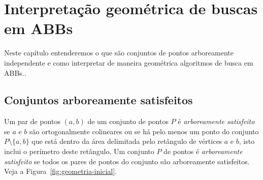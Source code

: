 
\chapter{Interpretação geométrica de buscas em ABBs}
\label{cap:geometria}

Neste capítulo entenderemos o que são conjuntos de pontos arboreamente independente e como interpretar de maneira geométrica algoritmos de busca em ABBs..

\section{Conjuntos arboreamente satisfeitos}

Um par de pontos $(a,b)$ de um conjunto de pontos $P$ é \textit{arboreamente satisfeito} se $a$ e $b$ são ortogonalmente colineares ou se há pelo menos um ponto do conjunto \( P \setminus \{a,b\} \) que está dentro da área delimitada pelo retângulo de vértices $a$ e $b$, isto inclui o perímetro deste retângulo. Um conjunto $P$ de pontos é \textit{arboreamente satisfeito} se todos os pares de pontos do conjunto são arboreamente satisfeitos. Veja a Figura~\ref{fig:geometria-inicial}.

